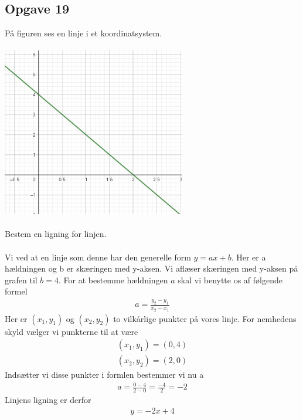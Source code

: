 \subsection{Opgave 19}

På figuren ses en linje i et koordinatsystem.\\\\
\includegraphics[width=8cm]{Opgave_11-20/Opgave_19/19.jpg}\\\\
Bestem en ligning for linjen.\\\\

\ans
Vi ved at en linje som denne har den generelle form $y = ax + b$. Her er a hældningen og b er skæringen med y-aksen. Vi aflæser skæringen med y-aksen på grafen til $b = 4$. For at bestemme hældningen $a$ skal vi benytte os af følgende formel
\begin{align*}
    a = \frac{y_2-y_1}{x_2-x_1}
\end{align*}
Her er $(x_1,y_1)$ og $(x_2,y_2)$ to vilkårlige punkter på vores linje. For nemhedens skyld vælger vi punkterne til at være 
\begin{align*}
    (x_1,y_1) = (0,4)\\
    (x_2,y_2) = (2,0)
\end{align*}
Indsætter vi disse punkter i formlen bestemmer vi nu a
\begin{align*}
    a = \frac{0-4}{2-0}=\frac{-4}{2}=-2
\end{align*}
Linjens ligning er derfor
\begin{align*}
    y = -2x + 4
\end{align*}